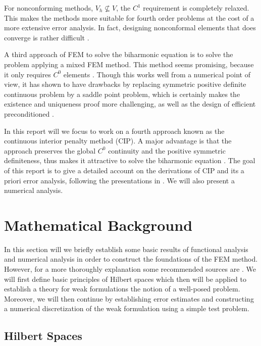 For nonconforming methods, $V_{h} \not \subseteq  V$, the $C^{1}$ requirement is completely relaxed. This makes the methods more suitable for fourth order problems at the cost of a more extensive error analysis. In fact, designing nonconformal
elements that does converge is rather difficult \cite{shi02, nair21}.

A third approach of FEM to solve the biharmonic equation is to solve the problem applying a mixed FEM method. This method seems promising, because it only requires $C^{0}$ elements \cite{chen08, brezzi91}.
Though this works well from a numerical point of view, it has shown to have drawbacks by replacing symmetric positive definite continuous problem
by a saddle point problem, which is certainly makes the existence and uniqueness proof more challenging, as well as the design of efficient preconditioned \cite{brezzi74}.

In this report will we focus to work on a fourth approach known as the continuous interior penalty method (CIP). A major advantage is that the approach preserves the global $C^{0}$ continuity and the positive symmetric definiteness, thus makes it
attractive to solve the biharmonic equation \cite{brenner2012, brenner2012quadratic}. The goal of this report is to give a detailed account on the derivations of CIP and its a priori error analysis, following the presentations in \cite{gu2012c0, brenner2012}. We will also present a numerical analysis.


\section{Mathematical Background}%
\label{sub:mathematical_background}

In this section will we briefly establish some basic results of functional analysis and numerical analysis in order to construct the foundations of the FEM method. However, for a more thoroughly explanation some recommended sources are
\cite{brenner07math,manzoni2021optimal, quartdiff}. We will first define basic principles of Hilbert spaces which then will be applied to establish a theory for weak formulations the notion of a well-posed problem. Moreover, we will then continue by
establishing error estimates and constructing a numerical discretization of the weak formulation using a simple test problem.

\subsection{Hilbert Spaces}%
\label{sub:hilbert_spaces}

